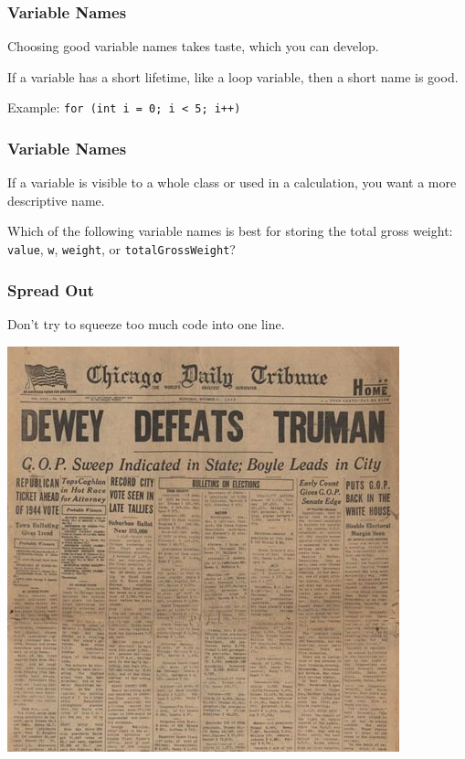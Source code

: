 \begin{frame}
\frametitle{Variable Names}
\begin{changemargin}{1cm}

Choosing good variable names takes taste, which you can develop.

If a variable has a short lifetime, like a loop variable, then a short name
is good.

Example: {\tt for (int i = 0; i < 5; i++)}

\end{changemargin}
\end{frame}

\begin{frame}
\frametitle{Variable Names}
\begin{changemargin}{1cm}

If a variable is visible to a whole class or used in a calculation, you want a more descriptive name.

Which of the following variable names is best for storing the total gross weight: \texttt{value}, \texttt{w}, \texttt{weight}, or \texttt{totalGrossWeight}? 

\end{changemargin}
\end{frame}

\begin{frame}
\frametitle{Spread Out}
\begin{changemargin}{1cm}

Don't try to squeeze too much code into one line. 

\begin{center}
	\includegraphics[width=.65\textwidth]{images/newspaper.jpg}
\end{center} 

\end{changemargin}
\end{frame}

